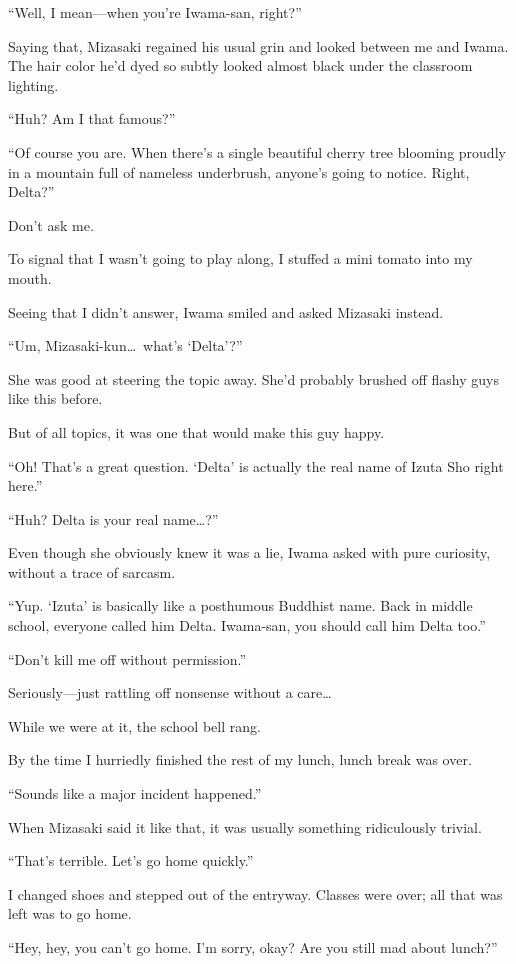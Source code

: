 \documentclass[
    a4paper,
    12pt,
    twoside,
    openany,
    UTF8,
    fontset=windows
]{ctexbook}
\begin{document}
``Well, I mean---when you're Iwama-san, right?''

Saying that, Mizasaki regained his usual grin and looked between me and Iwama. The hair color he'd dyed so subtly looked almost black under the classroom lighting.

``Huh? Am I that famous?''

``Of course you are. When there's a single beautiful cherry tree blooming proudly in a mountain full of nameless underbrush, anyone's going to notice. Right, Delta?''

Don't ask me.

To signal that I wasn't going to play along, I stuffed a mini tomato into my mouth.

Seeing that I didn't answer, Iwama smiled and asked Mizasaki instead.

``Um, Mizasaki-kun\dots\ what's `Delta'?''

She was good at steering the topic away. She'd probably brushed off flashy guys like this before.

But of all topics, it was one that would make this guy happy.

``Oh! That's a great question. `Delta' is actually the real name of Izuta Sho right here.''

``Huh? Delta is your real name\dots?''

Even though she obviously knew it was a lie, Iwama asked with pure curiosity, without a trace of sarcasm.

``Yup. `Izuta' is basically like a posthumous Buddhist name. Back in middle school, everyone called him Delta. Iwama-san, you should call him Delta too.''

``Don't kill me off without permission.''

Seriously---just rattling off nonsense without a care\dots

While we were at it, the school bell rang.

By the time I hurriedly finished the rest of my lunch, lunch break was over.

``Sounds like a major incident happened.''

When Mizasaki said it like that, it was usually something ridiculously trivial.

``That's terrible. Let's go home quickly.''

I changed shoes and stepped out of the entryway. Classes were over; all that was left was to go home.

``Hey, hey, you can't go home. I'm sorry, okay? Are you still mad about lunch?''
\end{document}
